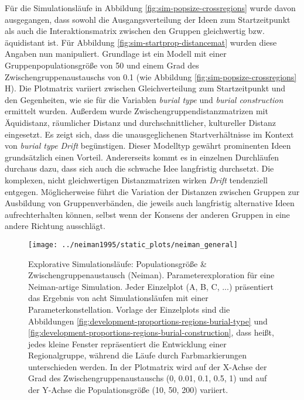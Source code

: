\documentclass[openany,twoside,twocolumn]{book}
\begin{document}
Für die Simulationsläufe in Abbildung \ref{fig:sim-popsize-crossregions} wurde davon ausgegangen, dass sowohl die Ausgangsverteilung der Ideen zum Startzeitpunkt als auch die Interaktionsmatrix zwischen den Gruppen gleichwertig bzw. äquidistant ist. Für Abbildung \ref{fig:sim-startprop-distancemat} wurden diese Angaben nun manipuliert. Grundlage ist ein Modell mit einer Gruppenpopulationsgröße von 50 und einem Grad des Zwischengruppenaustauschs von 0.1 (wie Abbildung \ref{fig:sim-popsize-crossregions} H). Die Plotmatrix variiert zwischen Gleichverteilung zum Startzeitpunkt und den Gegenheiten, wie sie für die Variablen \emph{burial type} und \emph{burial construction} ermittelt wurden. Außerdem wurde Zwischengruppendistanzmatrizen mit Äquidistanz, räumlicher Distanz und durchschnittlicher, kultureller Distanz eingesetzt. Es zeigt sich, dass die unausgeglichenen Startverhältnisse im Kontext von \emph{burial type} \emph{Drift} begünstigen. Dieser Modelltyp gewährt prominenten Ideen grundsätzlich einen Vorteil. Andererseits kommt es in einzelnen Durchläufen durchaus dazu, dass sich auch die schwache Idee langfristig durchsetzt. Die komplexen, nicht gleichwertigen Distanzmatrizen wirken \emph{Drift} tendenziell entgegen. Möglicherweise führt die Variation der Distanzen zwischen Gruppen zur Ausbildung von Gruppenverbänden, die jeweils auch langfristig alternative Ideen aufrechterhalten können, selbst wenn der Konsens der anderen Gruppen in eine andere Richtung ausschlägt.

\begin{figure}[!t]

{\centering \texttt{[image: ../neiman1995/static\_plots/neiman\_general]} 

}

\caption[Explorative Simulationsläufe: Populationsgröße \& Zwischengruppenaustausch (Neiman)]{Explorative Simulationsläufe: Populationsgröße \& Zwischengruppenaustausch (Neiman). Parameterexploration für eine Neiman-artige Simulation. Jeder Einzelplot (A, B, C, ...) präsentiert das Ergebnis von acht Simulationsläufen mit einer Parameterkonstellation. Vorlage der Einzelplots sind die Abbildungen \ref{fig:development-proportions-regions-burial-type} und \ref{fig:development-proportions-regions-burial-construction}, dass heißt, jedes kleine Fenster repräsentiert die Entwicklung einer Regionalgruppe, während die Läufe durch Farbmarkierungen unterschieden werden. In der Plotmatrix wird auf der X-Achse der Grad des Zwischengruppenaustauschs (0, 0.01, 0.1, 0.5, 1) und auf der Y-Achse die Populationsgröße (10, 50, 200) variiert.}\label{fig:neiman-general}
\end{figure}
\end{document}
